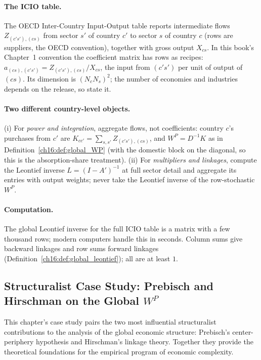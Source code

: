 \documentclass[../structural_economics_book.tex]{subfiles}
\begin{document}
\paragraph{The ICIO table.} The OECD Inter-Country Input-Output table reports intermediate flows $Z_{(c's'),(cs)}$ from sector $s'$ of country $c'$ to sector $s$ of country $c$ (rows are suppliers, the OECD convention), together with gross output $X_{cs}$. In this book's Chapter~1 convention the coefficient matrix has rows as recipes: $a_{(cs),(c's')} = Z_{(c's'),(cs)}/X_{cs}$, the input from $(c's')$ per unit of output of $(cs)$. Its dimension is $(N_cN_s)^2$; the number of economies and industries depends on the release, so state it.

\paragraph{Two different country-level objects.} (i) For \emph{power and integration}, aggregate flows, not coefficients: country $c$'s purchases from $c'$ are $K_{cc'} = \sum_{s,s'}Z_{(c's'),(cs)}$, and $W^P = D^{-1}K$ as in Definition~\ref{ch16:def:global_WP} (with the domestic block on the diagonal, so this is the absorption-share treatment). (ii) For \emph{multipliers and linkages}, compute the Leontief inverse $L = (I - A')^{-1}$ at full sector detail and aggregate its entries with output weights; never take the Leontief inverse of the row-stochastic $W^P$.

\paragraph{Computation.} The global Leontief inverse for the full ICIO table is a matrix with a few thousand rows; modern computers handle this in seconds. Column sums give backward linkages and row sums forward linkages (Definition~\ref{ch16:def:global_leontief}); all are at least $1$.


\subsection*{Structuralist Case Study: Prebisch and Hirschman on the Global $W^P$}

This chapter's case study pairs the two most influential structuralist contributions to the analysis of the global economic structure: Prebisch's center-periphery hypothesis and Hirschman's linkage theory. Together they provide the theoretical foundations for the empirical program of economic complexity.
\end{document}
